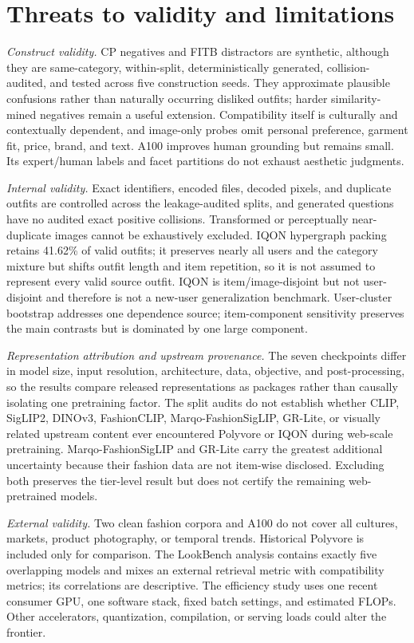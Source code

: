 \documentclass[preprint,12pt]{elsarticle}
\begin{document}
\section{Threats to validity and limitations}\label{sec:limitations}

\textit{Construct validity.} CP negatives and FITB distractors are synthetic, although they are same-category, within-split, deterministically generated, collision-audited, and tested across five construction seeds. They approximate plausible confusions rather than naturally occurring disliked outfits; harder similarity-mined negatives remain a useful extension. Compatibility itself is culturally and contextually dependent, and image-only probes omit personal preference, garment fit, price, brand, and text. A100 improves human grounding but remains small. Its expert/human labels and facet partitions do not exhaust aesthetic judgments.

\textit{Internal validity.} Exact identifiers, encoded files, decoded pixels, and duplicate outfits are controlled across the leakage-audited splits, and generated questions have no audited exact positive collisions. Transformed or perceptually near-duplicate images cannot be exhaustively excluded. IQON hypergraph packing retains 41.62\% of valid outfits; it preserves nearly all users and the category mixture but shifts outfit length and item repetition, so it is not assumed to represent every valid source outfit. IQON is item/image-disjoint but not user-disjoint and therefore is not a new-user generalization benchmark. User-cluster bootstrap addresses one dependence source; item-component sensitivity preserves the main contrasts but is dominated by one large component.

\textit{Representation attribution and upstream provenance.} The seven checkpoints differ in model size, input resolution, architecture, data, objective, and post-processing, so the results compare released representations as packages rather than causally isolating one pretraining factor. The split audits do not establish whether CLIP, SigLIP2, DINOv3, FashionCLIP, Marqo-FashionSigLIP, GR-Lite, or visually related upstream content ever encountered Polyvore or IQON during web-scale pretraining. Marqo-FashionSigLIP and GR-Lite carry the greatest additional uncertainty because their fashion data are not item-wise disclosed. Excluding both preserves the tier-level result but does not certify the remaining web-pretrained models.

\textit{External validity.} Two clean fashion corpora and A100 do not cover all cultures, markets, product photography, or temporal trends. Historical Polyvore is included only for comparison. The LookBench analysis contains exactly five overlapping models and mixes an external retrieval metric with compatibility metrics; its correlations are descriptive. The efficiency study uses one recent consumer GPU, one software stack, fixed batch settings, and estimated FLOPs. Other accelerators, quantization, compilation, or serving loads could alter the frontier.
\end{document}
